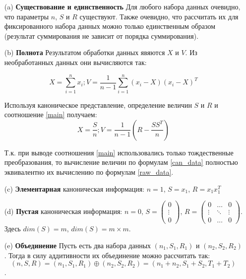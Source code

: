 \documentclass[12pt,a4paper]{article}
\begin{document}
\begin{enumerate}
\item[(a)] \textbf{Существование и единственность} Для любого набора данных очевидно, что параметры $n$, $S$ и $R$ существуют. Также очевидно, что рассчитать их для фиксированного набора данных можно только единственным образом (результат суммирования не зависит от порядка суммирования).
\item[(b)] \textbf{Полнота} Результатом обработки данных явяются $X$ и $V$.
Из необработанных данных они вычисляются так:

\begin{equation}
	\label{raw_data}
	X = \sum_{i = 1}^{n}x_i; V = \frac{1}{n-1}\sum_{i = 1}^{n}(x_i - X)(x_i - X)^T
\end{equation}

Используя каноническое представление, определение величин $S$ и $R$ и соотношение \ref{main} получаем:
\begin{equation}
	\label{can_data}
	X = \frac{S}{n}; V = \frac{1}{n-1}\left(R - \frac{SS^T}{n}\right)
\end{equation}

Т.к. при выводе соотношения \ref{main} использовались только тождественные преобразования, то вычисление величин по формулам \ref{can_data} полностью эквивалентно их вычислению по формулам \ref{raw_data}.

\item[(c)] \textbf{Элементарная} каноническая информация: $n = 1$, $S = x_1$, $R = x_1x_1^T$

\item[(d)] \textbf{Пустая} каноническая информация: $n = 0$, $S = \left(\begin{array}{c}0 \\ \vdots \\ 0\end{array}\right)$, $R = \left(\begin{array}{ccc}0 & \ldots & 0 \\ \vdots & \ddots & \vdots \\ 0 & \ldots & 0 \end{array}\right)$. Здесь $dim(S) = m$, $dim(S) = m \times m$. 

\item[(e)] \textbf{Объединение} Пусть есть два набора данных $(n_1, S_1, R_1)$ и $(n_2, S_2, R_2)$. Тогда в силу аддитивности их объединение можно рассчитать так: $$(n, S, R) = (n_1, S_1, R_1) \oplus (n_2, S_2, R_2) = (n_1 + n_2, S_1 + S_2, T_1 + T_2)$$.


\end{enumerate}
\end{document}
